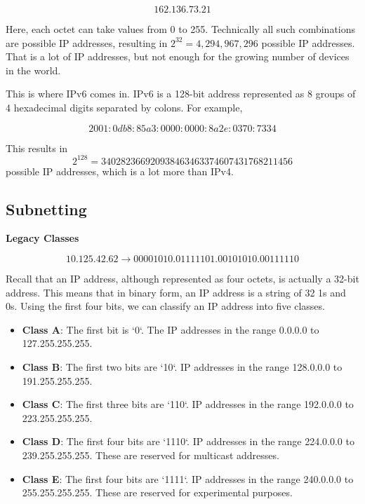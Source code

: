 \[
162.136.73.21
\]

Here, each octet can take values from 0 to 255.
Technically all such combinations are possible
IP addresses, resulting in
$2^{32} = 4,294,967,296$ possible IP addresses.
That is a lot of IP addresses, but not enough
for the growing number of devices in the world.

This is where IPv6 comes in. IPv6 is a 128-bit
address represented as 8 groups of 4 hexadecimal
digits separated by colons. For example,

\[
2001:0db8:85a3:0000:0000:8a2e:0370:7334
\]


This results in
\[
  2^{128} = 340282366920938463463374607431768211456
\]
possible IP addresses, which is a lot more than
IPv4.

\subsection{Subnetting}

\textbf{Legacy Classes}

\[
10.125.42.62 \rightarrow 0 0 0 0 1 0 1 0 . 0 1 1 1 1 1 0 1 . 0 0 1 0 1 0 1 0 . 0 0 1 1 1 1 1 0
\]

Recall that an IP address, although represented as
four octets, is actually a 32-bit address. This
means that in binary form, an IP address is a
string of 32 1s and 0s. Using the first four bits,
we can classify an IP address into five classes.

\begin{itemize}
\item \textbf{Class A}: The first bit is `0`. The
IP addresses in the range 0.0.0.0 to 127.255.255.255.
\item \textbf{Class B}: The first two bits are `10`.
IP addresses in the range 128.0.0.0 to 191.255.255.255.
\item \textbf{Class C}: The first three bits are `110`.
IP addresses in the range 192.0.0.0 to 223.255.255.255.
\item \textbf{Class D}: The first four bits are `1110`.
IP addresses in the range 224.0.0.0 to 239.255.255.255.
These are reserved for multicast addresses.
\item \textbf{Class E}: The first four bits are `1111`.
IP addresses in the range 240.0.0.0 to 255.255.255.255.
These are reserved for experimental purposes.
\end{itemize}


